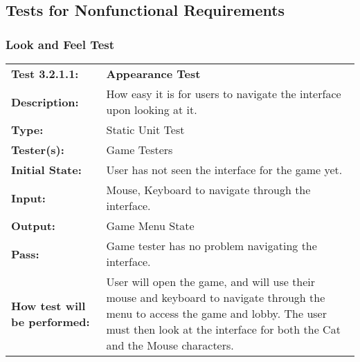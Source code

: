 \documentclass[12pt, titlepage]{article}
\begin{document}
\subsection{Tests for Nonfunctional Requirements}
\subsubsection{Look and Feel Test}

\begin{mdframed}[linewidth=1pt]
\begin{tabularx}{\textwidth}{@{}p{3cm}X@{}}
{\bf Test 3.2.1.1:} & {\bf Appearance Test}\\[\baselineskip]
{\bf Description:} & How easy it is for users to navigate the interface upon looking at it.\\[0.5\baselineskip]
{\bf Type:} & Static Unit Test\\[0.5\baselineskip]
{\bf Tester(s):} & Game Testers\\[0.5\baselineskip]
{\bf Initial State:} & User has not seen the interface for the game yet.\\[0.5\baselineskip]
{\bf Input:} & Mouse, Keyboard to navigate through the interface.\\[0.5\baselineskip]
{\bf Output:} & Game Menu State\\[0.5\baselineskip]
{\bf Pass:} & Game tester has no problem navigating the interface.\\[0.5\baselineskip]
{\bf How test will be performed:} & User will open the game, and will use their mouse and keyboard to navigate through the menu to access the game and lobby. The user must then look at the interface for both the Cat and the Mouse characters.
\end{tabularx}
\end{mdframed}
\end{document}
